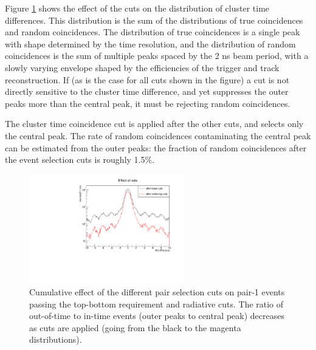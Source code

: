 Figure \ref{fig:basecut_performance} shows the effect of the cuts on the distribution of cluster time differences.
This distribution is the sum of the distributions of true coincidences and random coincidences.
The distribution of true coincidences is a single peak with shape determined by the time resolution, and the distribution of random coincidences is the sum of multiple peaks spaced by the 2 ns beam period, with a slowly varying envelope shaped by the efficiencies of the trigger and track reconstruction.
If (as is the case for all cuts shown in the figure) a cut is not directly sensitive to the cluster time difference, and yet suppresses the outer peaks more than the central peak, it must be rejecting random coincidences.

The cluster time coincidence cut is applied after the other cuts, and selects only the central peak.
The rate of random coincidences contaminating the central peak can be estimated from the outer peaks: the fraction of random coincidences after the event selection cuts is roughly 1.5\%.

\begin{figure}[ht]
\begin{center}
    \includegraphics[width=0.6\textwidth,page=2,angle=-90]{recon/figs/basecutplots}
\end{center}
    \caption{Cumulative effect of the different pair selection cuts on pair-1 events passing the top-bottom requirement and radiative cuts.
    The ratio of out-of-time to in-time events (outer peaks to central peak) decreases as cuts are applied (going from the black to the magenta distributions).
    }
    \label{fig:basecut_performance}
\end{figure}


